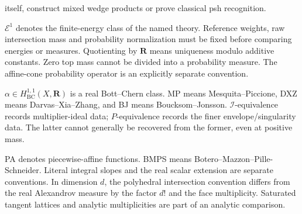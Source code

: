 \documentclass[11pt,a4paper]{article}
\theoremstyle{definition}
\theoremstyle{remark}
\begin{document}
\begin{description}
itself, construct mixed wedge products or prove classical psh recognition.
\item[Global energy and mass.]
\(\mathcal E^1\) denotes the finite-energy class of the named theory.
Reference weights, raw intersection mass and probability normalization
must be fixed before comparing energies or measures. Quotienting by
\(\mathbf R\) means uniqueness modulo additive constants. Zero top mass
cannot be divided into a probability measure. The affine-cone probability
operator is an explicitly separate convention.
\item[Complex singularity data.]
\(\alpha\in H^{1,1}_{\mathrm{BC}}(X,\mathbf R)\) is a real Bott--Chern class.
MP means Mesquita--Piccione, DXZ means Darvas--Xia--Zhang, and BJ means
Boucksom--Jonsson. \(\mathcal I\)-equivalence records multiplier-ideal data;
\(P\)-equivalence records the finer envelope/singularity data. The latter
cannot generally be recovered from the former, even at positive mass.
\item[Polyhedral normalization.]
PA denotes piecewise-affine functions. BMPS means
Botero--Mazzon--Pille-Schneider. Literal integral slopes and the real scalar
extension are separate conventions. In dimension \(d\), the polyhedral
intersection convention differs from the real Alexandrov measure by the
factor \(d!\) and the face multiplicity. Saturated tangent lattices and
analytic multiplicities are part of an analytic comparison.
\end{description}
\end{document}
